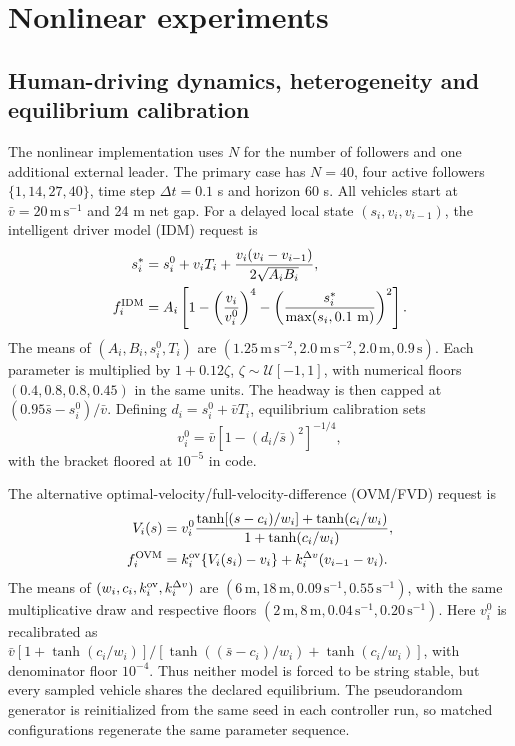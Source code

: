 \documentclass[11pt]{article}
\begin{document}
\section{Nonlinear experiments}\label{sec:nonlinear}
\subsection*{Human-driving dynamics, heterogeneity and equilibrium calibration}
The nonlinear implementation uses $N$ for the number of followers and one additional external leader. The primary case has $N=40$, four active followers $\{1,14,27,40\}$, time step $\Delta t=0.1$ s and horizon 60 s. All vehicles start at $\bar v=20\,\mathrm{m\,s^{-1}}$ and 24 m net gap. For a delayed local state $(s_i,v_i,v_{i-1})$, the intelligent driver model (IDM) request is
\begin{align}
s_i^*&=s_i^0+v_iT_i+\frac{v_i(v_i-v_{i-1})}{2\sqrt{A_iB_i}},\\
f_i^{\rm IDM}&=A_i\left[1-\left(\frac{v_i}{v_i^0}\right)^4-
\left(\frac{s_i^*}{\max(s_i,0.1\ \mathrm m)}\right)^2\right].
\end{align}
The means of $(A_i,B_i,s_i^0,T_i)$ are $(1.25\,\mathrm{m\,s^{-2}},2.0\,\mathrm{m\,s^{-2}},2.0\,\mathrm m,0.9\,\mathrm s)$. Each parameter is multiplied by $1+0.12\zeta$, $\zeta\sim\mathcal U[-1,1]$, with numerical floors $(0.4,0.8,0.8,0.45)$ in the same units. The headway is then capped at $(0.95\bar s-s_i^0)/\bar v$. Defining $d_i=s_i^0+\bar vT_i$, equilibrium calibration sets
\begin{equation}
v_i^0=\bar v\left[1-(d_i/\bar s)^2\right]^{-1/4},
\end{equation}
with the bracket floored at $10^{-5}$ in code.

The alternative optimal-velocity/full-velocity-difference (OVM/FVD) request is
\begin{align}
V_i(s)&=v_i^0\frac{\tanh[(s-c_i)/w_i]+\tanh(c_i/w_i)}{1+\tanh(c_i/w_i)},\\
f_i^{\rm OVM}&=k_i^{\rm ov}\{V_i(s_i)-v_i\}+k_i^{\Delta v}(v_{i-1}-v_i).
\end{align}
The means of $(w_i,c_i,k_i^{\rm ov},k_i^{\Delta v})$ are $(6\,\mathrm m,18\,\mathrm m,0.09\,\mathrm{s^{-1}},0.55\,\mathrm{s^{-1}})$, with the same multiplicative draw and respective floors $(2\,\mathrm m,8\,\mathrm m,0.04\,\mathrm{s^{-1}},0.20\,\mathrm{s^{-1}})$. Here $v_i^0$ is recalibrated as $\bar v[1+\tanh(c_i/w_i)]/[\tanh((\bar s-c_i)/w_i)+\tanh(c_i/w_i)]$, with denominator floor $10^{-4}$. Thus neither model is forced to be string stable, but every sampled vehicle shares the declared equilibrium. The pseudorandom generator is reinitialized from the same seed in each controller run, so matched configurations regenerate the same parameter sequence.
\end{document}
